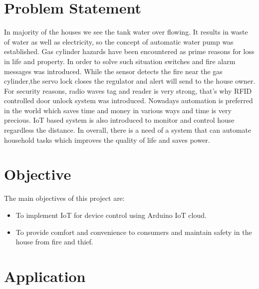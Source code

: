 \documentclass[12pt,a4paper]{report}
\begin{document}
	\section{Problem Statement}
	
	\begin{justify}
		In majority of the houses we see the tank water over flowing. It results in waste of water as well as electricity, so the concept of automatic water pump was established. Gas cylinder hazards have been encountered as prime reasons for loss in life and property. In order to solve such situation switches and fire alarm messages was introduced. While the sensor detects the fire near the gas cylinder,the servo lock closes the regulator and alert will send to the house owner. For security reasons, radio waves tag and reader is very strong, that's why RFID controlled door unlock system was introduced. Nowadays automation is preferred in the world which saves time and money in various ways and time is very precious. IoT based system is also introduced to monitor and control  house regardless the distance. In overall, there is a need of a system that can automate household tasks which improves the quality of life and saves power. 
	\end{justify}
	
	\section{Objective}
	
	\raggedright
	{ The main objectives of this project are: \\
		\begin{itemize}
			
			\item  To implement IoT for device control using Arduino IoT cloud.
			\item To provide comfort and convenience to consumers and maintain safety in the house from fire and thief.
		\end{itemize}
	}
	
	\section{Application}
	
\end{document}
